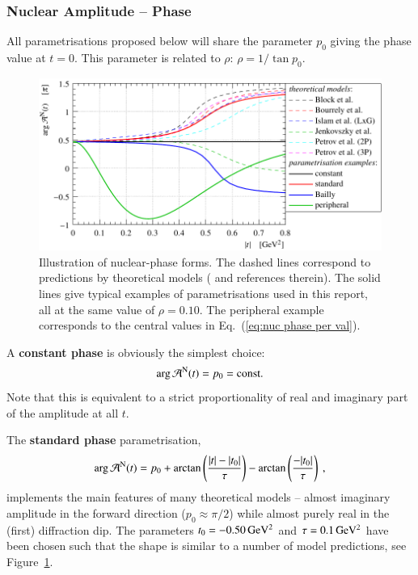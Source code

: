 \subsubsection{Nuclear Amplitude -- Phase}
\label{sec:cni nuclear phase}

All parametrisations proposed below will share the parameter $p_0$ giving the phase value at $t=0$. This parameter is related to $\rho$: $\rho = 1 / \tan p_0$.


\begin{figure}
\begin{center}
\includegraphics{fig/hadronic_phase_illustration.pdf}
\caption{Illustration of nuclear-phase forms. The dashed lines correspond to predictions by theoretical models (\cite{elegent} and references therein). The solid lines give typical examples of parametrisations used in this report, all at the same value of $\rho = 0.10$. The peripheral example corresponds to the central values in Eq.~(\ref{eq:nuc phase per val}).
}
\label{fig:phase illustration}
\end{center}
\end{figure}


A {\bf constant phase} is obviously the simplest choice:
\begin{equation}
\label{eq:nuc phase con}
\arg {\cal A}^{\rm N}(t) = p_0 = \hbox{const.}
\end{equation}
Note that this is equivalent to a strict proportionality of real and imaginary part of the amplitude at all $t$.

The {\bf standard phase} parametrisation,
\begin{equation}
\label{eqn:nuc phase std}
\arg {\cal A}^{\rm N}(t) = p_{0} + \arctan \left(\frac{|t|-|t_{0}|}{\tau}\right) -  \arctan \left(\frac{-|t_{0}|}{\tau}\right) \: ,
\end{equation}
implements the main features of many theoretical models -- almost imaginary amplitude in the forward direction ($p_0 \approx \pi/2$) while almost purely real in the (first) diffraction dip. The parameters $t_0 = - 0.50\,{\rm GeV^2}$ and $\tau = 0.1\,{\rm GeV^2}$ have been chosen such that the shape is similar to a number of model predictions, see Figure~\ref{fig:phase illustration}.

